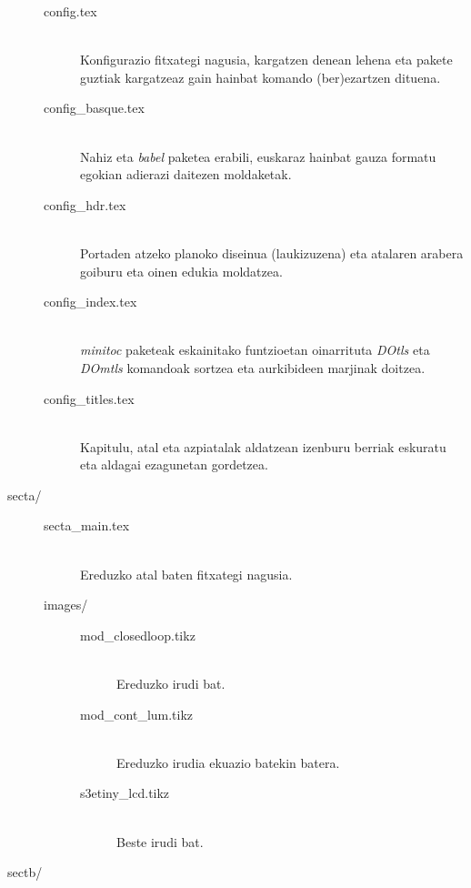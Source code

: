 \begin{description}
{  \begin{description}
   \item[config.tex]{\hfill\\Konfigurazio fitxategi nagusia, kargatzen denean lehena eta pakete guztiak kargatzeaz gain hainbat komando (ber)ezartzen dituena.}
   \item[config\_basque.tex]{\hfill\\Nahiz eta \emph{babel} paketea erabili, euskaraz hainbat gauza formatu egokian adierazi daitezen moldaketak.}
   \item[config\_hdr.tex]{\hfill\\Portaden atzeko planoko diseinua (laukizuzena) eta atalaren arabera goiburu eta oinen edukia moldatzea.}
   \item[config\_index.tex]{\hfill\\\emph{minitoc} paketeak eskainitako funtzioetan oinarrituta \emph{DOtls} eta \emph{DOmtls} komandoak sortzea eta aurkibideen marjinak doitzea.}
   \item[config\_titles.tex]{\hfill\\Kapitulu, atal eta azpiatalak aldatzean izenburu berriak eskuratu eta aldagai ezagunetan gordetzea.}
  \end{description}
 }
 \item[secta/]{\hfill
 
  \begin{description}
   \item[secta\_main.tex]{\hfill\\Ereduzko atal baten fitxategi nagusia.}
   \item[images/]{\hfill
   
    \begin{description}
     \item[mod\_closedloop.tikz]{\hfill\\Ereduzko irudi bat.}
     \item[mod\_cont\_lum.tikz]{\hfill\\Ereduzko irudia ekuazio batekin batera.}
     \item[s3etiny\_lcd.tikz]{\hfill\\Beste irudi bat.}
    \end{description}   
   }
  \end{description} 
 }
 \item[sectb/]{\hfill
 
}
\end{description}
